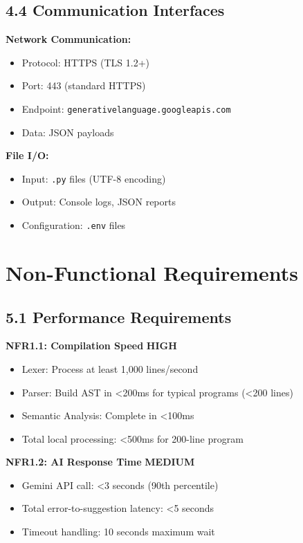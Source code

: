 \documentclass[a4paper,11pt]{article}
\newcommand{\priority}[1]{\colorbox{red!20}{\textbf{#1}}}
\newcommand{\prioritymed}[1]{\colorbox{yellow!20}{\textbf{#1}}}
\begin{document}
\subsection{4.4 Communication Interfaces}

\textbf{Network Communication:}
\begin{itemize}
    \item Protocol: HTTPS (TLS 1.2+)
    \item Port: 443 (standard HTTPS)
    \item Endpoint: \texttt{generativelanguage.googleapis.com}
    \item Data: JSON payloads
\end{itemize}

\textbf{File I/O:}
\begin{itemize}
    \item Input: \texttt{.py} files (UTF-8 encoding)
    \item Output: Console logs, JSON reports
    \item Configuration: \texttt{.env} files
\end{itemize}

\clearpage

\section{Non-Functional Requirements}

\subsection{5.1 Performance Requirements}

\textbf{NFR1.1: Compilation Speed} \priority{HIGH}

\begin{itemize}
    \item Lexer: Process at least 1,000 lines/second
    \item Parser: Build AST in <200ms for typical programs (<200 lines)
    \item Semantic Analysis: Complete in <100ms
    \item Total local processing: <500ms for 200-line program
\end{itemize}

\textbf{NFR1.2: AI Response Time} \prioritymed{MEDIUM}

\begin{itemize}
    \item Gemini API call: <3 seconds (90th percentile)
    \item Total error-to-suggestion latency: <5 seconds
    \item Timeout handling: 10 seconds maximum wait
\end{itemize}
\end{document}
